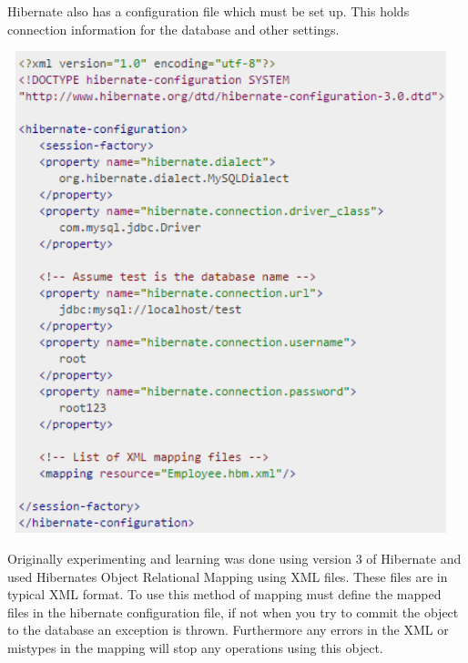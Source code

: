 Hibernate also has a configuration file which must be set up. This holds connection information for the database and other settings.

\begin{center}    
	\includegraphics[height=14cm, width=13cm]{img/hibernatesettings.png}
\end{center}

Originally experimenting and learning was done using version 3 of Hibernate and used Hibernates Object Relational Mapping using XML files. These files are in typical XML format. To use this method of mapping must define the mapped files in the hibernate configuration file, if not when you try to commit the object to the database an exception is thrown. Furthermore any errors in the XML or mistypes in the mapping will stop any operations using this object.

